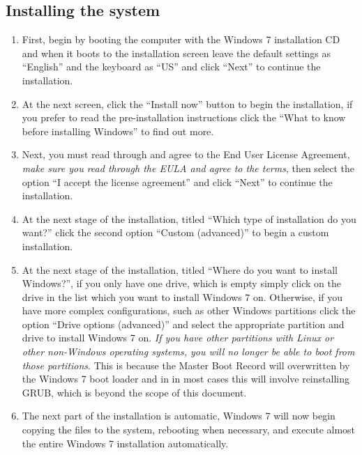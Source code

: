 \subsection{Installing the system}
\label{sec:windows7install}
\flushleft
\begin{enumerate}
\item	First, begin by booting the computer with the Windows 7 installation CD and when it boots to the installation screen leave the default
		settings as ``English'' and the keyboard as ``US'' and click ``Next'' to continue the installation.
		
\item	At the next screen, click the ``Install now'' button to begin the installation, if you prefer to read the pre-installation 
		instructions click the  ``What to know before installing Windows'' to find out more.
		
\item	Next, you must read through and agree to the End User License Agreement, \emph{make sure you read through the EULA and agree to
		the terms}, then select the option ``I accept the license agreement'' and click ``Next'' to continue the installation.
		
\item	At the next stage of the installation, titled ``Which type of installation do you want?'' click the second option
		``Custom (advanced)'' to begin a custom installation.
		
\item	At the next stage of the installation, titled ``Where do you want to install Windows?'', if you only have one drive, which is
		empty simply click on the drive in the list which you want to install Windows 7 on. Otherwise, if you have more complex
		configurations, such as other Windows partitions click the option ``Drive options (advanced)'' and select the appropriate
		partition and drive to install Windows 7 on. \emph{If you have other partitions with Linux or other non-Windows operating
		systems, you will no longer be able to boot from those partitions}. This is because the Master Boot Record will overwritten
		by the Windows 7 boot loader and in in most cases this will involve reinstalling GRUB, which is beyond the scope of this 
		document.
	  
\item	The next part of the installation is automatic, Windows 7 will now begin copying the files to the system, rebooting when 
		necessary, and execute almost the entire Windows 7 installation automatically.
		

\end{enumerate}
